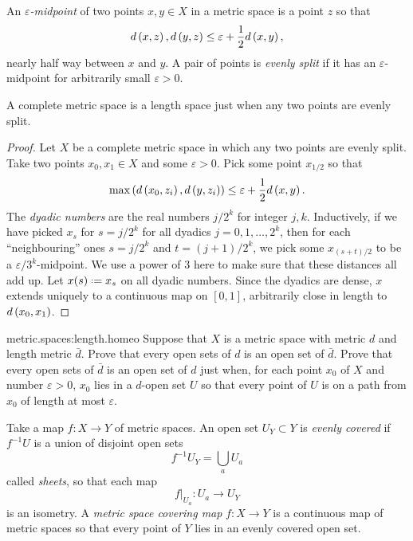 An \emph{\(\varepsilon\)-midpoint} of two points \(x, y \in X\) in a metric space is a point \(z\) so that 
\[
d\left(x,z\right), d\left(y,z\right) \le \varepsilon + \frac{1}{2}d\left(x,y\right),
\]
nearly half way between \(x\) and \(y\).
A pair of points is \emph{evenly split} if it has an \(\varepsilon\)-midpoint for arbitrarily small \(\varepsilon > 0\).
\begin{theorem}
A complete metric space is a length space just when any two points are evenly split.
\end{theorem}
\begin{proof}
Let \(X\) be a complete metric space in which any two points are evenly split.
Take two points \(x_0, x_1 \in X\) and some \(\varepsilon > 0\).
Pick some point \(x_{1/2}\) so that 
\[
\max\left(d\left(x_0,z_i\right),d\left(y,z_i\right)\right) \le \varepsilon + \frac{1}{2}d\left(x,y\right).
\]
The \emph{dyadic numbers} are the real numbers \(j/2^k\) for integer \(j, k\).
Inductively, if we have picked \(x_s\) for \(s=j/2^k\) for all dyadics \(j=0, 1, \dots, 2^k\), then for each ``neighbouring'' ones \(s=j/2^k\) and \(t=(j+1)/2^k\), we pick some \(x_{(s+t)/2}\) to be a \(\varepsilon/3^k\)-midpoint.
We use a power of \(3\) here to make sure that these distances all add up.
Let \(x(s)\defeq x_s\) on all dyadic numbers.
Since the dyadics are dense, \(x\) extends uniquely to a continuous map on \([0,1]\), arbitrarily close in length to \(d\left(x_0,x_1\right)\).
\end{proof}
\begin{problem}{metric.spaces:length.homeo}
Suppose that \(X\) is a metric space with metric \(d\) and length metric \(\bar{d}\).
Prove that every open sets of \(d\) is an open set of \(\bar{d}\).
Prove that every open sets of \(\bar{d}\) is an open set of \(d\) just when, for each point \(x_0\) of \(X\) and number \(\varepsilon>0\), \(x_0\) lies in a \(d\)-open set \(U\) so that every point of \(U\) is on a path from \(x_0\) of length at most \(\varepsilon\).
\end{problem}
Take a map \(f \colon X \to Y\) of metric spaces.
An open set \(U_Y \subset Y\) is \emph{evenly covered} if \(f^{-1}U\) is a union of disjoint open sets
\[
f^{-1}U_Y = \bigcup_a U_a
\] 
called \emph{sheets}, so that each map
\[
\left.f\right|_{U_a} \colon U_a \to U_Y
\]
is an isometry.
A \emph{metric space covering map} \(f \colon X \to Y\) is a continuous map of metric spaces so that every point of \(Y\) lies in an evenly covered open set.
